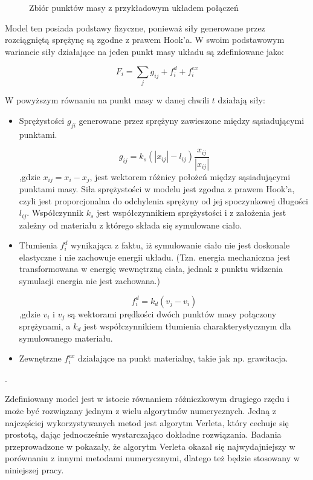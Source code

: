 \begin{figure}[ht]
\centering

\caption{Zbiór punktów masy z przykładowym układem połączeń}
\end{figure}
Model ten posiada podstawy fizyczne, ponieważ siły generowane przez rozciągniętą sprężynę są zgodne z prawem Hook'a. W swoim podstawowym wariancie siły działające na jeden punkt masy układu są zdefiniowane jako:

%
%
\begin{equation}
F_{i} = \sum_{j} g_{ij} + f^{d}_i + f^{ex}_{i}
\end{equation}

W powyższym równaniu na punkt masy w danej chwili $t$ działają siły:
\begin{itemize}
\item  Sprężystości $g_{ji}$ generowane przez sprężyny zawieszone między sąsiadującymi punktami.

\begin{equation}
g_{ij} = k_s (| x_{ij}| - l_{ij})\frac{x_{ij}}{|x_{ij}|}
\end{equation}
,gdzie $x_{ij} = x_i - x_j$, jest wektorem różnicy położeń między sąsiadującymi punktami masy. Siła sprężystości w modelu jest zgodna z prawem Hook'a, czyli jest proporcjonalna do odchylenia sprężyny od jej spoczynkowej długości $l_{ij}$. Współczynnik $k_s$ jest współczynnikiem sprężystości i z założenia jest zależny od materiału z którego składa się symulowane ciało.

\item Tłumienia $f^{d}_i$ wynikająca z faktu, iż symulowanie ciało nie jest doskonale elastyczne i nie zachowuje energii układu. (Tzn. energia mechaniczna jest transformowana w energię wewnętrzną ciała, jednak z punktu widzenia symulacji energia nie jest zachowana.)

\begin{equation}
f^{d}_i = k_d(v_j - v_i)
\end{equation}
,gdzie $v_i$ i $v_j$ są wektorami prędkości dwóch punktów masy połączony sprężynami, a $ k_d$ jest współczynnikiem tłumienia charakterystycznym dla symulowanego materiału.

\item Zewnętrzne $f^{ex}_{i}$ działające na punkt materialny, takie jak np. grawitacja.
\end{itemize}. 

Zdefiniowany model jest w istocie równaniem różniczkowym drugiego rzędu i może
być rozwiązany jednym z wielu algorytmów numerycznych. Jedną z najczęściej
wykorzystywanych metod jest algorytm Verleta, który cechuje się prostotą, dając
jednocześnie wystarczająco dokładne rozwiązania. Badania przeprowadzone w \cite{var} pokazały, że algorytm Verleta okazał się najwydajniejszy w porównaniu z innymi metodami numerycznymi, dlatego też będzie stosowany w niniejszej pracy.

